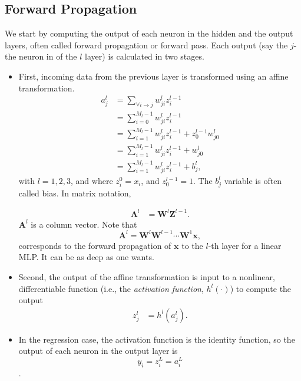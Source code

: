 \documentclass{tufte-handout}
\begin{document}
\subsection{Forward Propagation}
We start by computing the output of each neuron in the hidden and the output layers, often called forward propagation or forward pass. Each output (say the $j$-the neuron in of the $l$ layer) is calculated in two stages.
\begin{itemize}
\item First, incoming data from the previous layer is transformed using an affine transformation.
\begin{align}
a_j^l &= \sum_{\forall i \rightarrow j} w^l_{ji}z^{l-1}_i  \\ 
&= \sum_{i=0 }^{M_l-1} w^l_{ji}z^{l-1}_i  \nonumber\\
&=  \sum_{i=1 }^{M_l-1} w^l_{ji}z^{l-1}_i  + z^{l-1}_0w^l_{j0} \nonumber\\
&=  \sum_{i=1 }^{M_l-1} w^l_{ji}z^{l-1}_i  + w^l_{j0}\nonumber \\
&=  \sum_{i=1 }^{M_l-1} w^l_{ji}z^{l-1}_i  + b^l_{j}, \nonumber
\end{align}
with $l=1,2,3$, and where $z^0_i = x_i$, and $z_0^{l-1} = 1$. The $b^l_{j}$ variable is often called bias. In matrix notation,

\begin{align*}
\mathbf A^l&= 	\mathbf W^l \mathbf  Z^{l-1}.
\end{align*}
$\mathbf A^l$ is a column vector. Note that $$\mathbf A^l = \mathbf W^l \mathbf W^{l-1}\cdots \mathbf W^1\mathbf x,$$ corresponds to the forward propagation of $\mathbf x$ to the $l$-th layer for a linear MLP. It can be as deep as one wants.

\item Second, the output of the affine transformation is input to a nonlinear, differentiable function (i.e., the {\em activation function}, $h^l(\cdot)$) to compute the output
\begin{align*}
z_j^l &= h^l(a_j^l). 
\end{align*}



\item In the regression case, the activation function is the identity function, so  the output of each neuron in the output layer is
$$y_i = z^L_i = a_i^L$$.
\end{itemize}
\end{document}
